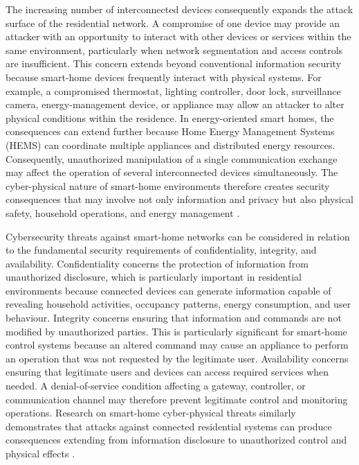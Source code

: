 The increasing number of interconnected devices consequently expands the attack surface of the residential network. A compromise of one device may provide an attacker with an opportunity to interact with other devices or services within the same environment, particularly when network segmentation and access controls are insufficient. This concern extends beyond conventional information security because smart-home devices frequently interact with physical systems. For example, a compromised thermostat, lighting controller, door lock, surveillance camera, energy-management device, or appliance may allow an attacker to alter physical conditions within the residence. In energy-oriented smart homes, the consequences can extend further because Home Energy Management Systems (HEMS) can coordinate multiple appliances and distributed energy resources. Consequently, unauthorized manipulation of a single communication exchange may affect the operation of several interconnected devices simultaneously. The cyber-physical nature of smart-home environments therefore creates security consequences that may involve not only information and privacy but also physical safety, household operations, and energy management \citep{heartfieldTaxonomyCyberphysicalThreats2018}.

Cybersecurity threats against smart-home networks can be considered in relation to the fundamental security requirements of confidentiality, integrity, and availability. Confidentiality concerns the protection of information from unauthorized disclosure, which is particularly important in residential environments because connected devices can generate information capable of revealing household activities, occupancy patterns, energy consumption, and user behaviour. Integrity concerns ensuring that information and commands are not modified by unauthorized parties. This is particularly significant for smart-home control systems because an altered command may cause an appliance to perform an operation that was not requested by the legitimate user. Availability concerns ensuring that legitimate users and devices can access required services when needed. A denial-of-service condition affecting a gateway, controller, or communication channel may therefore prevent legitimate control and monitoring operations. Research on smart-home cyber-physical threats similarly demonstrates that attacks against connected residential systems can produce consequences extending from information disclosure to unauthorized control and physical effects \citep{heartfieldTaxonomyCyberphysicalThreats2018}.

